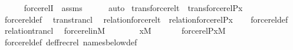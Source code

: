 \begin{isabellebody}
\ \ \ \ \isamarkupfalse%
\ forcerelI\ \ assms\isanewline
\ \ \ \ \isamarkupfalse%
\ auto\isanewline
{}\isamarkupfalse%
%
\endisatagproof
{\isafoldproof}%
%
\isadelimproof
%
\endisadelimproof
%
\isadelimdocument
%
\endisadelimdocument
%
\isatagdocument
%
\isamarkuptrue%
%
\endisatagdocument
{\isafolddocument}%
%
\isadelimdocument
%
\endisadelimdocument
{}\isamarkupfalse%
\ trans{\isacharunderscore}{\kern0pt}forcerel{\isacharunderscore}{\kern0pt}t\ {\isacharcolon}{\kern0pt}\ {\isachardoublequoteopen}trans{\isacharparenleft}{\kern0pt}forcerel{\isacharparenleft}{\kern0pt}P{\isacharcomma}{\kern0pt}x{\isacharparenright}{\kern0pt}{\isacharparenright}{\kern0pt}{\isachardoublequoteclose}\isanewline
%
\isadelimproof
\ \ %
\endisadelimproof
%
\isatagproof
{}\isamarkupfalse%
\ forcerel{\isacharunderscore}{\kern0pt}def\ \isamarkupfalse%
\ trans{\isacharunderscore}{\kern0pt}trancl\ \isacommand{{\isachardot}{\kern0pt}}\isamarkupfalse%
%
\endisatagproof
{\isafoldproof}%
%
\isadelimproof
\isanewline
%
\endisadelimproof
\isanewline
{}\isamarkupfalse%
\ relation{\isacharunderscore}{\kern0pt}forcerel{\isacharunderscore}{\kern0pt}t\ {\isacharcolon}{\kern0pt}\ {\isachardoublequoteopen}relation{\isacharparenleft}{\kern0pt}forcerel{\isacharparenleft}{\kern0pt}P{\isacharcomma}{\kern0pt}x{\isacharparenright}{\kern0pt}{\isacharparenright}{\kern0pt}{\isachardoublequoteclose}\isanewline
%
\isadelimproof
\ \ %
\endisadelimproof
%
\isatagproof
{}\isamarkupfalse%
\ forcerel{\isacharunderscore}{\kern0pt}def\ \isamarkupfalse%
\ relation{\isacharunderscore}{\kern0pt}trancl\ \isacommand{{\isachardot}{\kern0pt}}\isamarkupfalse%
%
\endisatagproof
{\isafoldproof}%
%
\isadelimproof
\isanewline
%
\endisadelimproof
\isanewline
\isanewline
{}\isamarkupfalse%
\ forcerel{\isacharunderscore}{\kern0pt}in{\isacharunderscore}{\kern0pt}M\ {\isacharcolon}{\kern0pt}\isanewline
\ \ \isanewline
\ \ \ \ {\isachardoublequoteopen}x{\isasymin}M{\isachardoublequoteclose}\isanewline
\ \ \isanewline
\ \ \ \ {\isachardoublequoteopen}forcerel{\isacharparenleft}{\kern0pt}P{\isacharcomma}{\kern0pt}x{\isacharparenright}{\kern0pt}{\isasymin}M{\isachardoublequoteclose}\isanewline
%
\isadelimproof
\ \ %
\endisadelimproof
%
\isatagproof
{}\isamarkupfalse%
\ forcerel{\isacharunderscore}{\kern0pt}def\ def{\isacharunderscore}{\kern0pt}frecrel\ names{\isacharunderscore}{\kern0pt}below{\isacharunderscore}{\kern0pt}def\isanewline

\end{isabellebody}
